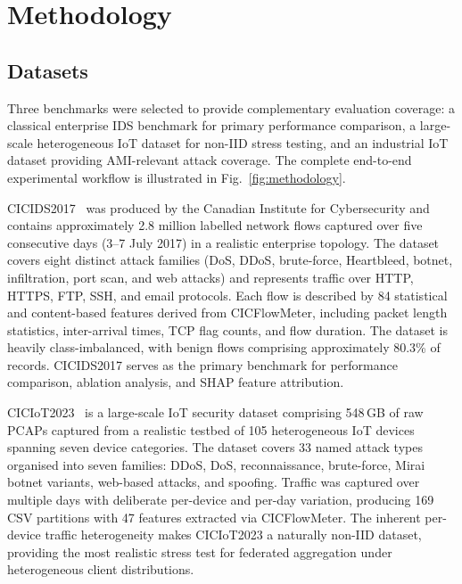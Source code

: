 \documentclass[sensors,article,submit,pdftex,moreauthors]{Definitions/mdpi}
\begin{document}
\section{Methodology}\label{r6}

\subsection{Datasets}

Three benchmarks were selected to provide complementary evaluation coverage: a classical enterprise IDS benchmark for primary performance comparison, a large-scale heterogeneous IoT dataset for non-IID stress testing, and an industrial IoT dataset providing AMI-relevant attack coverage. The complete end-to-end experimental workflow is illustrated in Fig.~\ref{fig:methodology}.

CICIDS2017~\cite{zhang2024federated} was produced by the Canadian Institute for Cybersecurity and contains approximately 2.8 million labelled network flows captured over five consecutive days (3--7 July 2017) in a realistic enterprise topology. The dataset covers eight distinct attack families (DoS, DDoS, brute-force, Heartbleed, botnet, infiltration, port scan, and web attacks) and represents traffic over HTTP, HTTPS, FTP, SSH, and email protocols. Each flow is described by 84 statistical and content-based features derived from CICFlowMeter, including packet length statistics, inter-arrival times, TCP flag counts, and flow duration. The dataset is heavily class-imbalanced, with benign flows comprising approximately 80.3\% of records. CICIDS2017 serves as the primary benchmark for performance comparison, ablation analysis, and SHAP feature attribution.

CICIoT2023~\cite{hamdi2025hybrid} is a large-scale IoT security dataset comprising 548\,GB of raw PCAPs captured from a realistic testbed of 105 heterogeneous IoT devices spanning seven device categories. The dataset covers 33 named attack types organised into seven families: DDoS, DoS, reconnaissance, brute-force, Mirai botnet variants, web-based attacks, and spoofing. Traffic was captured over multiple days with deliberate per-device and per-day variation, producing 169 CSV partitions with 47 features extracted via CICFlowMeter. The inherent per-device traffic heterogeneity makes CICIoT2023 a naturally non-IID dataset, providing the most realistic stress test for federated aggregation under heterogeneous client distributions.
\end{document}
